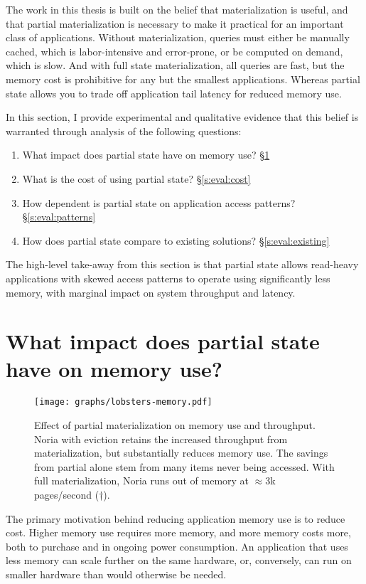 The work in this thesis is built on the belief that materialization is useful,
and that partial materialization is necessary to make it practical for an
important class of applications. Without materialization, queries must either be
manually cached, which is labor-intensive and error-prone, or be computed on
demand, which is slow. And with full state materialization, all queries are
fast, but the memory cost is prohibitive for any but the smallest applications.
Whereas partial state allows you to trade off application tail latency for
reduced memory use.

In this section, I provide experimental and qualitative evidence that this
belief is warranted through analysis of the following questions:

\begin{enumerate}
 \item What impact does partial state have on memory use? \S\ref{s:eval:mem}
 \item What is the cost of using partial state? \S\ref{s:eval:cost}
 \item How dependent is partial state on application access patterns? \S\ref{s:eval:patterns}
 \item How does partial state compare to existing solutions? \S\ref{s:eval:existing}
\end{enumerate}

The high-level take-away from this section is that partial state allows
read-heavy applications with skewed access patterns to operate using
significantly less memory, with marginal impact on system throughput and
latency.

\section{What impact does partial state have on memory use?}
\label{s:eval:mem}

\begin{figure}[ht]
  \centering
  \texttt{[image: graphs/lobsters-memory.pdf]}
  \caption{Effect of partial materialization on memory use and throughput. Noria
  with eviction retains the increased throughput from materialization, but
  substantially reduces memory use. The savings from partial alone stem from
  many items never being accessed. With full materialization, Noria runs out of
  memory at $\approx$3k pages/second (†).}
  \label{f:lobsters-memory}
\end{figure}

The primary motivation behind reducing application memory use is to reduce cost.
Higher memory use requires more memory, and more memory costs more, both to
purchase and in ongoing power consumption. An application that uses less
memory can scale further on the same hardware, or, conversely, can run on
smaller hardware than would otherwise be needed.

